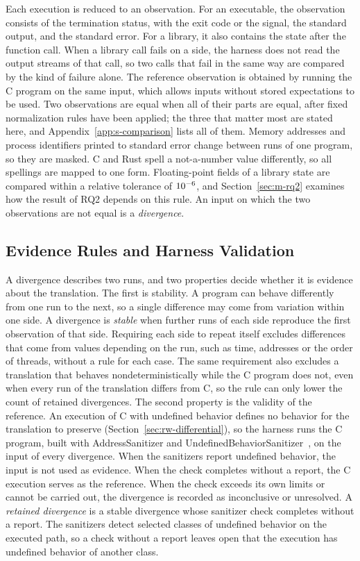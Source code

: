 Each execution is reduced to an observation. For an executable, the observation consists of the termination status, with the exit code or the signal, the standard output, and the standard error. For a library, it also contains the state after the function call. When a library call fails on a side, the harness does not read the output streams of that call, so two calls that fail in the same way are compared by the kind of failure alone. The reference observation is obtained by running the C program on the same input, which allows inputs without stored expectations to be used. Two observations are equal when all of their parts are equal, after fixed normalization rules have been applied; the three that matter most are stated here, and Appendix~\ref{app:s-comparison} lists all of them. Memory addresses and process identifiers printed to standard error change between runs of one program, so they are masked. C and Rust spell a not-a-number value differently, so all spellings are mapped to one form. Floating-point fields of a library state are compared within a relative tolerance of $10^{-6}$, and Section~\ref{sec:m-rq2} examines how the result of RQ2 depends on this rule. An input on which the two observations are not equal is a \emph{divergence}.

\subsection{Evidence Rules and Harness Validation}\label{sec:m-evidence}

A divergence describes two runs, and two properties decide whether it is evidence about the translation. The first is stability. A program can behave differently from one run to the next, so a single difference may come from variation within one side. A divergence is \emph{stable} when \pStabReps{} further runs of each side reproduce the first observation of that side. Requiring each side to repeat itself excludes differences that come from values depending on the run, such as time, addresses or the order of threads, without a rule for each case. The same requirement also excludes a translation that behaves nondeterministically while the C program does not, even when every run of the translation differs from C, so the rule can only lower the count of retained divergences. The second property is the validity of the reference. An execution of C with undefined behavior defines no behavior for the translation to preserve (Section~\ref{sec:rw-differential}), so the harness runs the C program, built with AddressSanitizer and UndefinedBehaviorSanitizer~\cite{serebryany2012asan,ubsan}, on the input of every divergence. When the sanitizers report undefined behavior, the input is not used as evidence. When the check completes without a report, the C execution serves as the reference. When the check exceeds its own limits or cannot be carried out, the divergence is recorded as inconclusive or unresolved. A \emph{retained divergence} is a stable divergence whose sanitizer check completes without a report. The sanitizers detect selected classes of undefined behavior on the executed path, so a check without a report leaves open that the execution has undefined behavior of another class.

